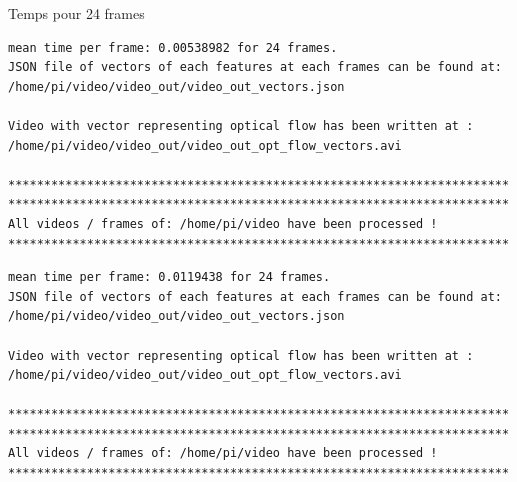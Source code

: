 \documentclass{bredelebeamer}
\begin{document}
\begin{frame}[fragile]{Temps pour 24 frames}

\begin{lstlisting}
mean time per frame: 0.00538982 for 24 frames.
JSON file of vectors of each features at each frames can be found at: /home/pi/video/video_out/video_out_vectors.json

Video with vector representing optical flow has been written at : /home/pi/video/video_out/video_out_opt_flow_vectors.avi

**********************************************************************
**********************************************************************
All videos / frames of: /home/pi/video have been processed !
**********************************************************************
\end{lstlisting}

\begin{lstlisting}
mean time per frame: 0.0119438 for 24 frames.
JSON file of vectors of each features at each frames can be found at: /home/pi/video/video_out/video_out_vectors.json

Video with vector representing optical flow has been written at : /home/pi/video/video_out/video_out_opt_flow_vectors.avi

**********************************************************************
**********************************************************************
All videos / frames of: /home/pi/video have been processed !
**********************************************************************
\end{lstlisting}

\end{frame}

\end{document}
